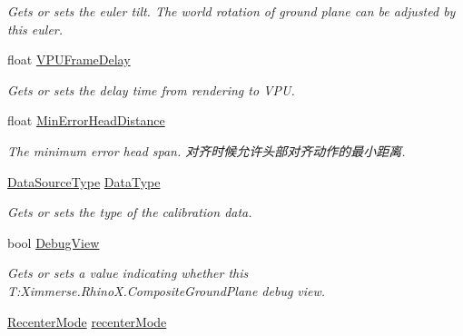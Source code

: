 \begin{DoxyCompactItemize}
\begin{DoxyCompactList}\small\item\em Gets or sets the euler tilt. The world rotation of ground plane can be adjusted by this euler. \end{DoxyCompactList}\item 
float \mbox{\hyperlink{class_ximmerse_1_1_rhino_x_1_1_composite_ground_plane_a7246973f95874588d8e595abfb5dce6c}{V\+P\+U\+Frame\+Delay}}
\begin{DoxyCompactList}\small\item\em Gets or sets the delay time from rendering to V\+PU. \end{DoxyCompactList}\item 
float \mbox{\hyperlink{class_ximmerse_1_1_rhino_x_1_1_composite_ground_plane_a6f2c6a9d77578f52a3c58f2ddf29baff}{Min\+Error\+Head\+Distance}}
\begin{DoxyCompactList}\small\item\em The minimum error head span. 对齐时候允许头部对齐动作的最小距离. \end{DoxyCompactList}\item 
\mbox{\hyperlink{class_ximmerse_1_1_rhino_x_1_1_composite_ground_plane_aeb2c4782a573590b210966a4def66f33}{Data\+Source\+Type}} \mbox{\hyperlink{class_ximmerse_1_1_rhino_x_1_1_composite_ground_plane_a0140c3a8715e4ed1593aedec25877761}{Data\+Type}}
\begin{DoxyCompactList}\small\item\em Gets or sets the type of the calibration data. \end{DoxyCompactList}\item 
bool \mbox{\hyperlink{class_ximmerse_1_1_rhino_x_1_1_composite_ground_plane_aa56ba0b32c49f7cbb9132570d80276df}{Debug\+View}}
\begin{DoxyCompactList}\small\item\em Gets or sets a value indicating whether this T\+:\+Ximmerse.\+Rhino\+X.\+Composite\+Ground\+Plane debug view. \end{DoxyCompactList}\item 
\mbox{\hyperlink{class_ximmerse_1_1_rhino_x_1_1_composite_ground_plane_a04f66929fadbcaaf0d0f9c53cd856dfd}{Recenter\+Mode}} \mbox{\hyperlink{class_ximmerse_1_1_rhino_x_1_1_composite_ground_plane_ab3d601569c3bd22ab80d6ebf38f85c49}{recenter\+Mode}}

\end{DoxyCompactItemize}

